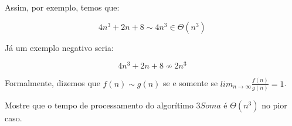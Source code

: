   Assim, por exemplo, temos que:

  \begin{displaymath}
    4n^3 + 2n + 8 \sim 4n^3 \in \Theta(n^3)
  \end{displaymath}

  Já um exemplo negativo seria:

  \begin{displaymath}
    4n^3 + 2n + 8 \nsim 2n^3 
  \end{displaymath}

  Formalmente, dizemos que $f(n) \sim g(n)$ se e somente se $lim_{n \to \infty}\frac{f(n)}{g(n)} = 1$.
  
  
\begin{exercicio}
  Mostre que o tempo de processamento do algorítimo $3Soma$ é $\Theta(n^3)$ no pior caso.
\end{exercicio}
